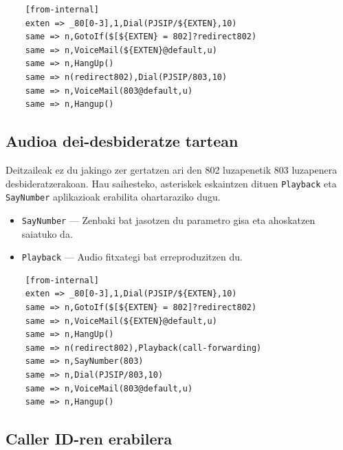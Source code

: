 \begin{listing}
    \begin{verbatim}
    [from-internal]
    exten => _80[0-3],1,Dial(PJSIP/${EXTEN},10)
    same => n,GotoIf($[${EXTEN} = 802]?redirect802)
    same => n,VoiceMail(${EXTEN}@default,u)
    same => n,HangUp()
    same => n(redirect802),Dial(PJSIP/803,10)
    same => n,VoiceMail(803@default,u)
    same => n,Hangup()
    \end{verbatim}
    \caption{802tik 803ra dei desbiderapenaren konfigurazioa extensions.conf konfigurazio fitxategian}
    \label{lst:extensions.conf-dei-desbideratzea}
\end{listing}

\subsection{Audioa dei-desbideratze tartean}

 Deitzaileak ez du jakingo zer gertatzen ari den 802 luzapenetik 803 luzapenera desbideratzerakoan. Hau saihesteko, asteriskek eskaintzen dituen \texttt{Playback} eta \texttt{SayNumber} aplikazioak erabilita ohartaraziko dugu.
\begin{itemize}
    \item \texttt{SayNumber} --- Zenbaki bat jasotzen du parametro gisa eta ahoskatzen saiatuko da.
    \item \texttt{Playback} --- Audio fitxategi bat erreproduzitzen du.
\end{itemize}

\begin{listing}
    \begin{verbatim}
    [from-internal]
    exten => _80[0-3],1,Dial(PJSIP/${EXTEN},10)
    same => n,GotoIf($[${EXTEN} = 802]?redirect802)
    same => n,VoiceMail(${EXTEN}@default,u)
    same => n,HangUp()
    same => n(redirect802),Playback(call-forwarding)
    same => n,SayNumber(803)
    same => n,Dial(PJSIP/803,10)
    same => n,VoiceMail(803@default,u)
    same => n,Hangup()
    \end{verbatim}
    \caption{Dei desbiderapenaren abisuaren konfigurazioa extensions.conf konfigurazio fitxategian}
    \label{lst:extensions.conf-dei-desbideratzea-abisua}
\end{listing}

\subsection{Caller ID-ren erabilera}

